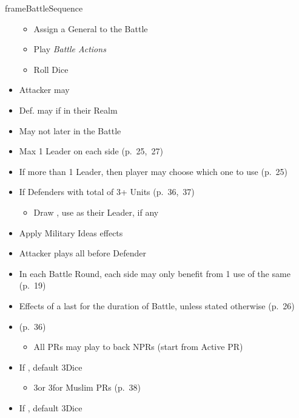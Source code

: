 \documentclass[10pt]{article}
\newlength{\fhBattleSequence} \setlength\fhBattleSequence{50\baselineskip}
\begin{document}
\begin{dynamiccontents*}{frameBattleSequence}
\begin{eubox}{\fhBattleSequence}
\begin{multicols}{2}
\begin{itemize}
\begin{itemize}
				\item Assign a General to the Battle
				\item Play \emph{Battle Actions}
				\item Roll Dice
			\end{itemize}
			\item Attacker may 
			\item Def. may  if in their Realm
			\item May not  later in the Battle
			\item Max 1 Leader on each side (p.~25,~27)
			\item If more than 1 Leader, then player may choose which one to use (p.~25)
			\item If  Defenders with total of 3+ Units (p.~36,~37)
			\begin{itemize}
				\item Draw \milcard, use as their Leader, if any
			\end{itemize}
			\item Apply Military Ideas effects
		\end{itemize}
		\begin{itemize}
			\item Attacker plays all \battleactions before Defender
			\item In each Battle Round, each side may only benefit from 1 use of the same \battleaction (p.~19)
			\item Effects of a \battleaction last for the duration of Battle, unless stated otherwise (p.~26)
			\item {} (p.~36)
			\begin{itemize}
				\item All PRs may play \battleactions to back NPRs (start from Active PR)
			\end{itemize}
		\end{itemize}
		\begin{itemize}
			\item If , default 3\infantry Dice
			\begin{itemize}
				\item 3\infantry or 3\cavalry for Muslim PRs (p.~38)
			\end{itemize}
			\item If , default 3\artillery Dice

\end{itemize}
\end{multicols}
\end{eubox}
\end{dynamiccontents*}
\end{document}
